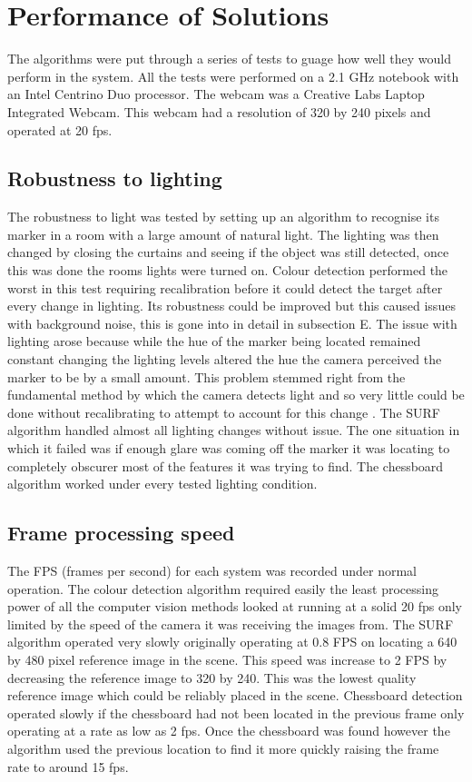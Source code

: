 \section{Performance of Solutions}
The algorithms were put through a series of tests to guage how well they would perform in the system. All the tests were performed on a 2.1 GHz notebook with an Intel Centrino Duo processor. The webcam was a Creative Labs Laptop Integrated Webcam. This webcam had a resolution of 320 by 240 pixels and operated at 20 fps.

\subsection{Robustness to lighting}
The robustness to light was tested by setting up an algorithm to recognise its marker in a room with a large amount of natural light. The lighting was then changed by closing the curtains and seeing if the object was still detected, once this was done the rooms lights were turned on. Colour detection performed the worst in this test requiring recalibration before it could detect the target after every change in lighting. Its robustness could be improved but this caused issues with background noise, this is gone into in detail in subsection E. The issue  with lighting arose because while the hue of the marker being located remained constant changing the lighting levels altered the hue the camera perceived the marker to be by a small amount. This problem stemmed right from the fundamental method by which the camera detects light and so very little could be done without recalibrating to attempt to account for this change \cite{detect}. The SURF algorithm handled almost all lighting changes without issue. The one situation in which it failed was if enough glare was coming off the marker it was locating to completely obscurer most of the features it was trying to find. The chessboard algorithm worked under every tested lighting condition.

\subsection{Frame processing speed}
The FPS (frames per second) for each system was recorded under normal operation. The colour detection algorithm required easily the least processing power of all the computer vision methods looked at running at a solid 20 fps only limited by the speed of the camera it was receiving the images from. The SURF algorithm operated very slowly originally operating at 0.8 FPS on locating a 640 by 480 pixel reference image in the scene. This speed was increase to 2 FPS by decreasing the reference image to 320 by 240. This was the lowest quality reference image which could be reliably placed in the scene. Chessboard detection operated slowly if the chessboard had not been located in the previous frame only operating at a rate as low as 2 fps. Once the chessboard was found however the algorithm used the previous location to find it more quickly raising the frame rate to around 15 fps.

